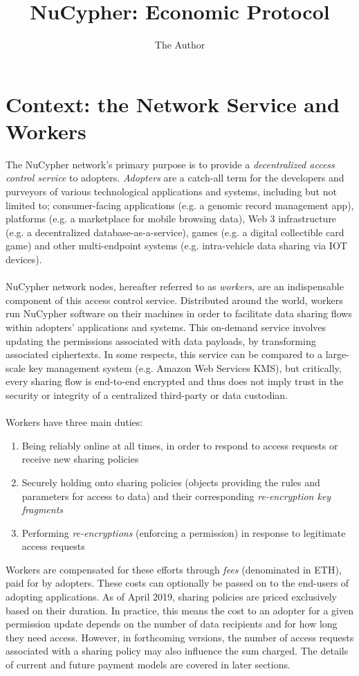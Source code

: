 \documentclass[11pt]{amsart}
\title{NuCypher: Economic Protocol}
\author{The Author}
\begin{document}
\pagecolor{magicmint!30}
\maketitle

\section{Context: the Network Service and Workers}\label{context}

The NuCypher network's primary purpose is to provide a {\it decentralized access control service} to adopters. \textit{Adopters} are a catch-all term for the developers and purveyors of various technological applications and systems, including but not limited to; consumer-facing applications (e.g. a genomic record management app), platforms (e.g. a marketplace for mobile browsing data), Web 3 infrastructure (e.g. a decentralized database-as-a-service), games (e.g. a digital collectible card game) and other multi-endpoint systems (e.g. intra-vehicle data sharing via IOT devices).
\\
\\
NuCypher network nodes, hereafter referred to as \textit{workers}, are an indispensable component of this access control service. Distributed around the world, workers run NuCypher software on their machines in order to facilitate data sharing flows within adopters' applications and systems. This on-demand service involves updating the permissions associated with data payloads, by transforming associated ciphertexts. In some respects, this service can be compared to a large-scale key management system (e.g. Amazon Web Services KMS), but critically, every sharing flow is end-to-end encrypted and thus does not imply trust in the security or integrity of a centralized third-party or data custodian. 
\\
\\
Workers have three main duties:
\begin{enumerate}
   \item Being reliably online at all times, in order to respond to access requests or receive new sharing policies
   \item Securely holding onto sharing policies (objects providing the rules and parameters for access to data) and their corresponding {\it re-encryption key fragments}
   \item Performing {\it re-encryptions} (enforcing a permission) in response to legitimate access requests
\end{enumerate}
Workers are compensated for these efforts through \textit{fees} (denominated in ETH), paid for by adopters. These costs can optionally be passed on to the end-users of adopting applications. As of April 2019, sharing policies are priced exclusively based on their duration. In practice, this means the cost to an adopter for a given permission update depends on the number of data recipients and for how long they need access. However, in forthcoming versions, the number of access requests associated with a sharing policy may also influence the sum charged. The details of current and future payment models are covered in later sections.
\end{document}
